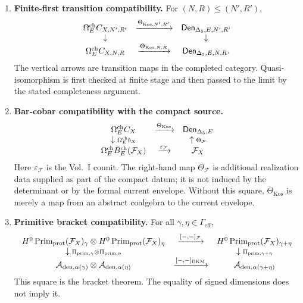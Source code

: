 \begin{enumerate}
\item \textbf{Finite-first transition compatibility.}  For
\((N,R)\leq(N',R')\),
$$
\begin{array}{ccc}
\Omega^{\mathrm{ch}}_E C_{X,N',R'} & \xrightarrow{\Theta_{\mathrm{Kos},N',R'}}
& \mathsf{Den}_{\Delta_5,E,N',R'}\\
\downarrow && \downarrow\\
\Omega^{\mathrm{ch}}_E C_{X,N,R} & \xrightarrow{\Theta_{\mathrm{Kos},N,R}}
& \mathsf{Den}_{\Delta_5,E,N,R}.
\end{array}
$$
The vertical arrows are transition maps in the completed category.
Quasi-isomorphism is first checked at finite stage and then passed to
the limit by the stated completeness argument.

\item \textbf{Bar-cobar compatibility with the compact source.}
$$
\begin{array}{ccc}
\Omega^{\mathrm{ch}}_E C_X
& \xrightarrow{\Theta_{\mathrm{Kos}}}
& \mathsf{Den}_{\Delta_5,E}\\
\downarrow{\scriptstyle \Omega^{\mathrm{ch}}_E b_X}
&&
\uparrow{\scriptstyle \Theta_{\mathcal F}}\\
\Omega^{\mathrm{ch}}_E\bar B_E^{\mathrm{ch}}(\mathcal F_X)
& \xrightarrow{\varepsilon_{\mathcal F}}
& \mathcal F_X
\end{array}
$$
Here \(\varepsilon_{\mathcal F}\) is the Vol.~I counit.  The right-hand
map \(\Theta_{\mathcal F}\) is additional realization data supplied as
part of the compact datum; it is not induced by the determinant or by
the formal current envelope.  Without this square,
\(\Theta_{\mathrm{Kos}}\) is merely a map from an abstract coalgebra to
the current envelope.

\item \textbf{Primitive bracket compatibility.}  For all
\(\gamma,\eta\in\Gamma_{\mathrm{eff}}\),
$$
\begin{array}{ccc}
H^0\operatorname{Prim}_{\mathrm{prot}}(\mathcal F_X)_\gamma
\otimes
H^0\operatorname{Prim}_{\mathrm{prot}}(\mathcal F_X)_\eta
& \xrightarrow{[-,-]_{\mathcal F}}
& H^0\operatorname{Prim}_{\mathrm{prot}}(\mathcal F_X)_{\gamma+\eta}\\
\downarrow{\scriptstyle \Pi_{\mathrm{prim},\gamma}\otimes
\Pi_{\mathrm{prim},\eta}}
&&
\downarrow{\scriptstyle \Pi_{\mathrm{prim},\gamma+\eta}}\\
\mathcal A_{\mathrm{den},\alpha(\gamma)}
\otimes
\mathcal A_{\mathrm{den},\alpha(\eta)}
& \xrightarrow{[-,-]_{\mathrm{BKM}}}
& \mathcal A_{\mathrm{den},\alpha(\gamma+\eta)}
\end{array}
$$
This square is the bracket theorem.  The equality of signed dimensions
does not imply it.


\end{enumerate}
